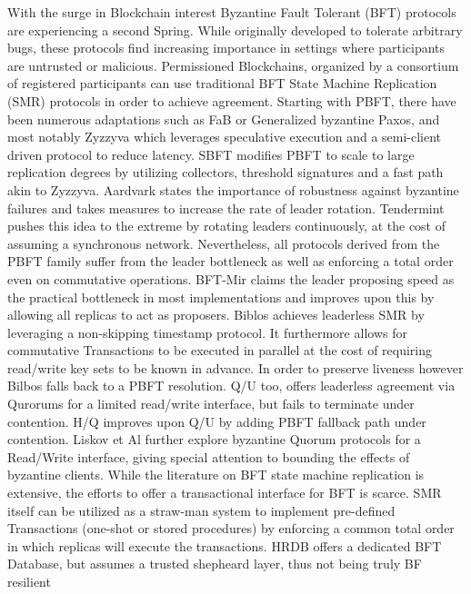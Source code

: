 With the surge in Blockchain interest Byzantine Fault Tolerant (BFT) protocols are experiencing a second Spring. While originally developed to tolerate arbitrary bugs, these protocols find increasing importance in settings where participants are untrusted or malicious. Permissioned Blockchains, organized by a consortium of registered participants can use traditional BFT State Machine Replication (SMR) protocols in order to achieve agreement. Starting with PBFT, there have been numerous adaptations such as FaB or Generalized byzantine Paxos, and most notably Zyzzyva which leverages speculative execution and a semi-client driven protocol to reduce latency. SBFT modifies PBFT to scale to large replication degrees by utilizing collectors, threshold signatures and a fast path akin to Zyzzyva. Aardvark states the importance of robustness against byzantine failures and takes measures to increase the rate of leader rotation. Tendermint pushes this idea to the extreme by rotating leaders continuously, at the cost of assuming a synchronous network.
Nevertheless, all protocols derived from the PBFT family suffer from the leader bottleneck as well as enforcing a total order even on commutative operations. BFT-Mir claims the leader proposing speed as the practical bottleneck in most implementations and improves upon this by allowing all replicas to act as proposers.
Biblos achieves leaderless SMR by leveraging a non-skipping timestamp protocol. It furthermore allows for commutative Transactions to be executed in parallel at the cost of requiring read/write key sets to be known in advance. In order to preserve liveness however Bilbos falls back to a PBFT resolution. Q/U too, offers leaderless agreement via Qurorums for a limited read/write interface, but fails to terminate under contention. H/Q improves upon Q/U by adding PBFT fallback path under contention. Liskov et Al further explore byzantine Quorum protocols for a Read/Write interface, giving special attention to bounding the effects of byzantine clients. 
While the literature on BFT state machine replication is extensive, the efforts to offer a transactional interface for BFT is scarce. SMR itself can be utilized as a straw-man system to implement pre-defined Transactions (one-shot or stored procedures) by enforcing a common total order  in which replicas will execute the transactions. 
HRDB offers a dedicated BFT Database, but assumes a trusted shepheard layer, thus not being truly BF resilient
